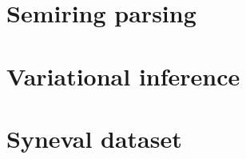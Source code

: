 \documentclass{uvamath}
\theoremstyle{remark}
\theoremstyle{definition}
\theoremstyle{definition}
\theoremstyle{definition}
\theoremstyle{definition}
\theoremstyle{definition}
\begin{document}
\chapter{Semiring parsing}
\label{A3-crf}



\chapter{Variational inference}
\label{A4-vi}



\chapter{Syneval dataset}
\label{A5-syneval}





\end{document}
